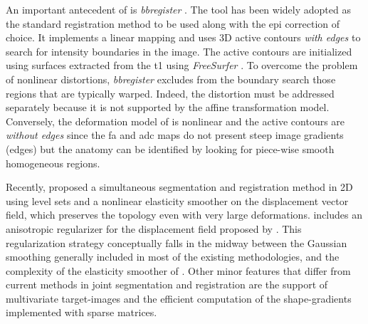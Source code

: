 An important antecedent of \regseg{} is \emph{bbregister} \citep{greve_accurate_2009}.
The tool has been widely adopted as the standard registration method to be used along with the \gls*{epi}
  correction of choice.
It implements a linear mapping and uses 3D active contours \emph{with edges} to
  search for intensity boundaries in the \lowb{} image.
The active contours are initialized using surfaces extracted from the \gls*{t1} using
  \emph{FreeSurfer} \citep{fischl_freesurfer_2012}.
To overcome the problem of nonlinear distortions, \emph{bbregister} excludes from the
  boundary search those regions that are typically warped.
Indeed, the distortion must be addressed separately because it is not supported by
  the affine transformation model.
Conversely, the deformation model of \regseg{} is nonlinear and the active contours are
  \emph{without edges} \citep{chan_active_2001} since the \gls*{fa} and \gls*{adc} maps
  do not present steep image gradients (edges) but the anatomy can be identified
  by looking for piece-wise smooth homogeneous regions.

Recently, \cite{guyader_combined_2011} proposed a simultaneous segmentation and
  registration method in 2D using level sets and a nonlinear elasticity smoother on the
  displacement vector field, which preserves the topology even with very large deformations.
\Regseg{} includes an anisotropic regularizer for the displacement field proposed by
  \cite{nagel_investigation_1986}.
This regularization strategy conceptually falls in the midway between the Gaussian smoothing
  generally included in most of the existing methodologies, and the complexity of
  the elasticity smoother of \cite{guyader_combined_2011}.
Other minor features that differ from current methods in joint segmentation and registration are
  the support of multivariate target-images and the efficient computation of the shape-gradients
  implemented with sparse matrices.

